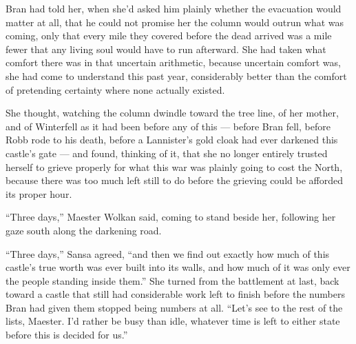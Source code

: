 Bran had told her, when she’d asked him plainly whether the evacuation would matter at all, that he could not promise her the column would outrun what was coming, only that every mile they covered before the dead arrived was a mile fewer that any living soul would have to run afterward. She had taken what comfort there was in that uncertain arithmetic, because uncertain comfort was, she had come to understand this past year, considerably better than the comfort of pretending certainty where none actually existed.

She thought, watching the column dwindle toward the tree line, of her mother, and of Winterfell as it had been before any of this — before Bran fell, before Robb rode to his death, before a Lannister’s gold cloak had ever darkened this castle’s gate — and found, thinking of it, that she no longer entirely trusted herself to grieve properly for what this war was plainly going to cost the North, because there was too much left still to do before the grieving could be afforded its proper hour.

“Three days,” Maester Wolkan said, coming to stand beside her, following her gaze south along the darkening road.

“Three days,” Sansa agreed, “and then we find out exactly how much of this castle’s true worth was ever built into its walls, and how much of it was only ever the people standing inside them.” She turned from the battlement at last, back toward a castle that still had considerable work left to finish before the numbers Bran had given them stopped being numbers at all. “Let’s see to the rest of the lists, Maester. I’d rather be busy than idle, whatever time is left to either state before this is decided for us.”